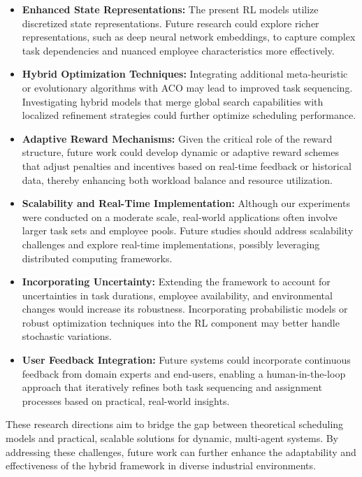 \documentclass[%
aip,
cp,  %
amsmath,amssymb,
reprint,%
]{revtex4-2}
\begin{document}
	\begin{itemize}
		\item \textbf{Enhanced State Representations:} The present RL models utilize
		discretized state representations. Future research could explore richer representations,
		such as deep neural network embeddings, to capture complex task dependencies
		and nuanced employee characteristics more effectively.
		
		\item \textbf{Hybrid Optimization Techniques:} Integrating additional
		meta-heuristic or evolutionary algorithms with ACO may lead to improved
		task sequencing. Investigating hybrid models that merge global search capabilities
		with localized refinement strategies could further optimize scheduling performance.
		
		\item \textbf{Adaptive Reward Mechanisms:} Given the critical role of the
		reward structure, future work could develop dynamic or adaptive reward schemes
		that adjust penalties and incentives based on real-time feedback or historical
		data, thereby enhancing both workload balance and resource utilization.
		
		\item \textbf{Scalability and Real-Time Implementation:} Although our
		experiments were conducted on a moderate scale, real-world applications often
		involve larger task sets and employee pools. Future studies should address
		scalability challenges and explore real-time implementations, possibly leveraging
		distributed computing frameworks.
		
		\item \textbf{Incorporating Uncertainty:} Extending the framework to account
		for uncertainties in task durations, employee availability, and
		environmental changes would increase its robustness. Incorporating probabilistic
		models or robust optimization techniques into the RL component may better handle
		stochastic variations.
		
		\item \textbf{User Feedback Integration:} Future systems could incorporate
		continuous feedback from domain experts and end-users, enabling a human-in-the-loop
		approach that iteratively refines both task sequencing and assignment processes
		based on practical, real-world insights.
	\end{itemize}
	
	These research directions aim to bridge the gap between theoretical scheduling
	models and practical, scalable solutions for dynamic, multi-agent systems. By addressing
	these challenges, future work can further enhance the adaptability and
	effectiveness of the hybrid framework in diverse industrial environments.
	
\end{document}
